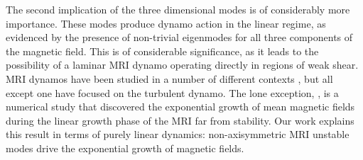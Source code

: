 \documentclass[aps,prl,reprint,superscriptaddress]{revtex4-1}
\begin{document}
The second implication of the three dimensional modes is of considerably more importance.
These modes produce dynamo action in the linear regime, as evidenced by the presence of non-trivial eigenmodes for all three components of the magnetic field.
This is of considerable significance, as it leads to the possibility of a laminar MRI dynamo operating directly in regions of weak shear.
MRI dynamos have been studied in a number of different contexts \citep{2007PhRvL..98y4502R,2011ApJ...740...18O,2015PhRvL.114h5002S}, but all except one have focused on the turbulent dynamo. The lone exception, \citet{2016MNRAS.462..818B}, is a numerical study that discovered the exponential growth of mean magnetic fields during the linear growth phase of the MRI far from stability.
Our work explains this result in terms of purely linear dynamics:
non-axisymmetric MRI unstable modes drive the exponential growth of magnetic fields.




%

\end{document}
